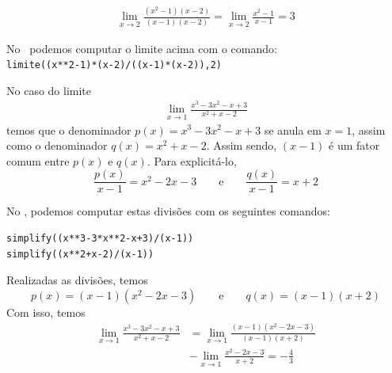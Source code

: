\cleardoublepage\documentclass[../main.tex]{subfiles}
\begin{document}
\begin{ex}
  \begin{align*}
    \lim_{x\to 2}\frac{(x^2-1)(x-2)}{(x-1)(x-2)} = \lim_{x\to 2} \frac{x^2-1}{x-1} = 3
  \end{align*}
  
  No \geogebra~podemos computar o limite acima com o comando:\\ \verb|limite((x**2-1)*(x-2)/((x-1)*(x-2)),2)|
\end{ex}

\begin{ex}
  No caso do limite
  \begin{align*}
    \lim_{x\to 1} \frac{x^3-3x^2-x+3}{x^2+x-2}
  \end{align*}
  temos que o denominador $p(x) = x^3-3x^2-x+3$ se anula em $x=1$, assim como o denominador $q(x) = x^2+x-2$. Assim sendo, $(x-1)$ é um fator comum entre $p(x)$ e $q(x)$. Para explicitá-lo, 
  \begin{equation*}
    \frac{p(x)}{x-1} = x^2-2x-3\qquad\text{e}\qquad\frac{q(x)}{x-1} = x+2
  \end{equation*}
  
  No \geogebra, podemos computar estas divisões com os seguintes comandos:
\begin{verbatim}
simplify((x**3-3*x**2-x+3)/(x-1))
simplify((x**2+x-2)/(x-1))
\end{verbatim}
 
  Realizadas as divisões, temos
  \begin{equation*}
    p(x) = (x-1)(x^2-2x-3)\qquad\text{e}\qquad q(x)=(x-1)(x+2)
  \end{equation*}
  Com isso, temos
  \begin{align*}
    \lim_{x\to 1} \frac{x^3-3x^2-x+3}{x^2+x-2} &= \lim_{x\to 1} \frac{(x-1)(x^2-2x-3)}{(x-1)(x+2)} \\
    &- \lim_{x\to 1} \frac{x^2-2x-3}{x+2} = -\frac{4}{3}
  \end{align*}
\end{ex}
\end{document}
